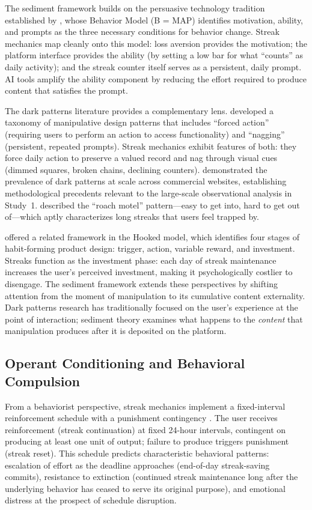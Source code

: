 \documentclass[12pt]{article}
\begin{document}
The sediment framework builds on the persuasive technology tradition established by \citet{Fogg2003}, whose Behavior Model (B = MAP) identifies motivation, ability, and prompts as the three necessary conditions for behavior change. Streak mechanics map cleanly onto this model: loss aversion provides the motivation; the platform interface provides the ability (by setting a low bar for what ``counts'' as daily activity); and the streak counter itself serves as a persistent, daily prompt. AI tools amplify the ability component by reducing the effort required to produce content that satisfies the prompt.

The dark patterns literature provides a complementary lens. \citet{Gray2018} developed a taxonomy of manipulative design patterns that includes ``forced action'' (requiring users to perform an action to access functionality) and ``nagging'' (persistent, repeated prompts). Streak mechanics exhibit features of both: they force daily action to preserve a valued record and nag through visual cues (dimmed squares, broken chains, declining counters). \citet{Mathur2019} demonstrated the prevalence of dark patterns at scale across commercial websites, establishing methodological precedents relevant to the large-scale observational analysis in Study~1. \citet{Brignull2010} described the ``roach motel'' pattern---easy to get into, hard to get out of---which aptly characterizes long streaks that users feel trapped by.

\citet{Eyal2014} offered a related framework in the Hooked model, which identifies four stages of habit-forming product design: trigger, action, variable reward, and investment. Streaks function as the investment phase: each day of streak maintenance increases the user's perceived investment, making it psychologically costlier to disengage. The sediment framework extends these perspectives by shifting attention from the moment of manipulation to its cumulative content externality. Dark patterns research has traditionally focused on the user's experience at the point of interaction; sediment theory examines what happens to the \emph{content} that manipulation produces after it is deposited on the platform.

\subsection{Operant Conditioning and Behavioral Compulsion}
\label{sec:lit-operant}

From a behaviorist perspective, streak mechanics implement a fixed-interval reinforcement schedule with a punishment contingency \citep{Skinner1953}. The user receives reinforcement (streak continuation) at fixed 24-hour intervals, contingent on producing at least one unit of output; failure to produce triggers punishment (streak reset). This schedule predicts characteristic behavioral patterns: escalation of effort as the deadline approaches (end-of-day streak-saving commits), resistance to extinction (continued streak maintenance long after the underlying behavior has ceased to serve its original purpose), and emotional distress at the prospect of schedule disruption.
\end{document}
